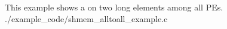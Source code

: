 \begin{apidefinition}
\begin{apiexamples}

\apicexample
    {This example shows a  on two long elements among all
    \acp{PE}.}
    {./example_code/shmem_alltoall_example.c}
    {}

\end{apiexamples}

\end{apidefinition}
\color{black}
